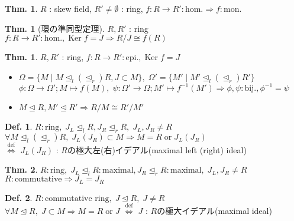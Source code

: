 \documentclass[uplatex,dvipdfmx,9pt]{beamer}
\newcommand{\defarrow}{\overset{\mathrm{def}}{\Leftrightarrow}}
\newcommand{\inverse}[1]{#1^{-1}}
\newcommand{\Ker}{\operatorname{Ker}}
\newcommand{\lideal}{\trianglelefteq_l}
\newcommand{\rideal}{\trianglelefteq_r}
\newcommand{\ideal}{\trianglelefteq}
\newcommand{\bij}{\text{bij.}}
\renewcommand{\hom}{\text{hom.}} %
\newcommand{\mon}{\text{mon.}} %
\newcommand{\epi}{\text{epi.}} %
\newcounter{textThmCount}
\theoremstyle{definition} %
\newtheorem{defn}{Def.}[subsection] %
\newtheorem{thm}{Thm.}[subsection] %
\newtheorem{thmText}[textThmCount]{Thm.}
\theoremstyle{example}
\begin{document}
    \begin{frame}

      \begin{thm}
        $R$ : skew field, $R' \neq \emptyset$ : ring, $f\colon R \to R' : \hom \Rightarrow f : \mon$
      \end{thm}

      \begin{thmText}[環の準同型定理]
        $R, R'$ : ring \\
        $f\colon R \to R' : \hom, \Ker f = J \Rightarrow R/J \cong f(R)$ 
      \end{thmText}

      \begin{thmText}
         $R, R'$ : ring, $f\colon R \to R' : \epi, \Ker f = J$ \\
        \begin{itemize}
          \item $\Omega = \{M \mid M \lideal(\rideal) R, J \subset M\}, \; \Omega' = \{M' \mid M' \lideal(\rideal) R'\}$ \\ 
                $\phi\colon \Omega \to \Omega' ; M \mapsto f(M), \; \psi\colon \Omega' \to \Omega ; M' \mapsto \inverse{f}(M') \Rightarrow \phi, \psi : \bij, \inverse{\phi} = \psi$
          \item $M \ideal R, M' \ideal R' \Rightarrow R/M \cong R'/M'$
        \end{itemize}       
      \end{thmText}
      
    \end{frame}

    \begin{frame}

      \begin{defn}
        $R : \text{ring}, \; J_L \lideal R, J_R \rideal R, \; J_L, J_R \neq R$ \\
        $\forall M \lideal (\rideal) R, \; J_L(J_R) \subset M \Rightarrow M = R \; \text{or} \; J_L(J_R)$ \\
        $\defarrow$ $J_L(J_R)$ : $R$の\alert{極大左(右)イデアル(maximal left (right) ideal)} \\
      \end{defn}

      \begin{thm}
        $R : \text{ring}, \; J_L \lideal R : \text{maximal}, J_R \rideal R : \text{maximal}, \; J_L, J_R \neq R$ \\
        $R : \text{commutative} \Rightarrow J_L = J_R$ 
      \end{thm}

      \begin{defn}
        $R : \text{commutative ring}, \; J \ideal R, \; J \neq R$ \\
        $\forall M \ideal R, \; J \subset M \Rightarrow M = R \; \text{or} \; J$ $\defarrow$ $J$ : $R$の\alert{極大イデアル(maximal ideal)}
      \end{defn}
     
    \end{frame}
\end{document}
